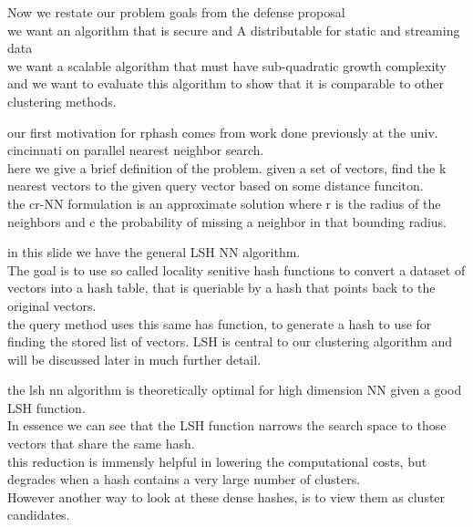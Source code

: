 \documentclass{beamer}
\begin{document}
\begin{frame}[plain]
Now we restate our problem goals from the defense proposal\\
we want an algorithm that is secure and A distributable for static and streaming data\\
we want a scalable algorithm that must have sub-quadratic growth complexity\\
and we want to evaluate this algorithm to show that it is comparable to other
clustering methods.
\end{frame}

\begin{frame}[plain]
our first motivation for rphash comes from work done previously at the univ.
cincinnati on parallel nearest neighbor search. \\
here we give a brief definition
of the problem. given a set of vectors, find the k nearest vectors to the
given query vector based on some distance funciton.\\
the cr-NN formulation is an approximate solution where r is the radius of
the neighbors and c the probability of missing a neighbor in that bounding radius.
\end{frame}

\begin{frame}[plain]
in this slide we have the general LSH NN algorithm. \\
The goal is to use so called
locality senitive hash functions to convert a dataset of vectors into a hash
table, that is queriable by a hash that points back to the original vectors.\\
the query method uses this same has function, to generate a hash to use for
finding the stored list of vectors. LSH is central to our clustering algorithm
and will be discussed later in much further detail.
\end{frame}

\begin{frame}[plain]
the lsh nn algorithm is theoretically optimal for high dimension NN given a
good LSH function. \\
In essence we can see that the LSH function narrows the
search space to those vectors that share the same hash. \\
this reduction is
immensly helpful in lowering the computational costs, but degrades when a
hash contains a very large number of clusters. \\
However another way to look
at these dense hashes, is to view them as cluster candidates.
\end{frame}
\end{document}
